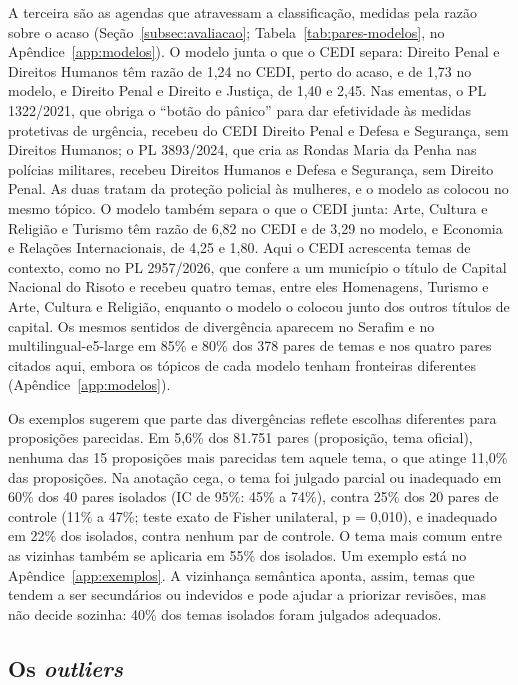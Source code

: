 \documentclass[12pt]{article}
\begin{document}
A terceira são as agendas que atravessam a classificação, medidas pela razão sobre o acaso (Seção~\ref{subsec:avaliacao}; Tabela~\ref{tab:pares-modelos}, no Apêndice~\ref{app:modelos}). O modelo junta o que o CEDI separa: Direito Penal e Direitos Humanos têm razão de 1,24 no CEDI, perto do acaso, e de 1,73 no modelo, e Direito Penal e Direito e Justiça, de 1,40 e 2,45. Nas ementas, o PL 1322/2021, que obriga o ``botão do pânico'' para dar efetividade às medidas protetivas de urgência, recebeu do CEDI Direito Penal e Defesa e Segurança, sem Direitos Humanos; o PL 3893/2024, que cria as Rondas Maria da Penha nas polícias militares, recebeu Direitos Humanos e Defesa e Segurança, sem Direito Penal. As duas tratam da proteção policial às mulheres, e o modelo as colocou no mesmo tópico. O modelo também separa o que o CEDI junta: Arte, Cultura e Religião e Turismo têm razão de 6,82 no CEDI e de 3,29 no modelo, e Economia e Relações Internacionais, de 4,25 e 1,80. Aqui o CEDI acrescenta temas de contexto, como no PL 2957/2026, que confere a um município o título de Capital Nacional do Risoto e recebeu quatro temas, entre eles Homenagens, Turismo e Arte, Cultura e Religião, enquanto o modelo o colocou junto dos outros títulos de capital. Os mesmos sentidos de divergência aparecem no Serafim e no multilingual-e5-large em 85\% e 80\% dos 378 pares de temas e nos quatro pares citados aqui, embora os tópicos de cada modelo tenham fronteiras diferentes (Apêndice~\ref{app:modelos}).

Os exemplos sugerem que parte das divergências reflete escolhas diferentes para proposições parecidas. Em 5,6\% dos 81.751 pares (proposição, tema oficial), nenhuma das 15 proposições mais parecidas tem aquele tema, o que atinge 11,0\% das proposições. Na anotação cega, o tema foi julgado parcial ou inadequado em 60\% dos 40 pares isolados (IC de 95\%: 45\% a 74\%), contra 25\% dos 20 pares de controle (11\% a 47\%; teste exato de Fisher unilateral, p = 0,010), e inadequado em 22\% dos isolados, contra nenhum par de controle. O tema mais comum entre as vizinhas também se aplicaria em 55\% dos isolados. Um exemplo está no Apêndice~\ref{app:exemplos}. A vizinhança semântica aponta, assim, temas que tendem a ser secundários ou indevidos e pode ajudar a priorizar revisões, mas não decide sozinha: 40\% dos temas isolados foram julgados adequados.

\subsection{Os \textit{outliers}}
\label{subsec:res-outliers}
\end{document}
